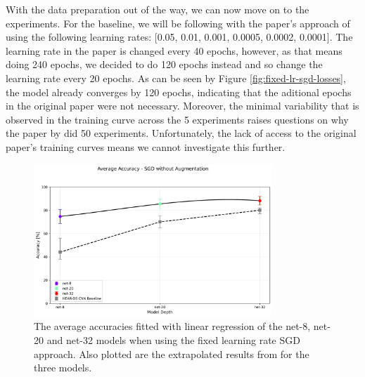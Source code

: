 \documentclass[logo,bsc,singlespacing,parskip,online]{infthesis}
\begin{document}
With the data preparation out of the way, we can now move on to the experiments.
For the baseline, we will be following with the paper's approach of using the following 
learning rates: [0.05, 0.01, 0.001, 0.0005, 0.0002, 0.0001].
The learning rate in the paper is changed every 40 epochs, however, as that means doing 
240 epochs, we decided to do 120 epochs instead and so change the learning rate every 20 epochs.
As can be seen by Figure \ref{fig:fixed-lr-sgd-losses}, the model already converges by 120 epochs,
indicating that the aditional epochs in the original paper were not necessary. 
Moreover, the minimal variability that is observed in the training curve across the 5 experiments 
raises questions on why the paper by \citet{Huwel2020HearDS} did 50 experiments. Unfortunately,
the lack of access to the original paper's training curves means we cannot investigate this further. 

\begin{figure}[h]
   \centering
   \includegraphics[width=0.8\textwidth]{average_accuracies_sgd_no_aug.png}
   \caption{The average accuracies fitted with linear regression of the net-8, net-20 and net-32 models when using the fixed learning rate SGD approach.
   Also plotted are the extrapolated results from \citet{Huwel2020HearDS} for the three models.
   }
   \label{fig:fixed-lr-sgd-accuracies}
\end{figure}
\end{document}
